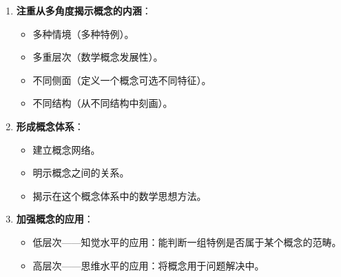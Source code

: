 \begin{multicols}{2}
    

\begin{enumerate}
    \item \textbf{注重从多角度揭示概念的内涵}：
    \begin{itemize}
        \item 多种情境（多种特例）。
        \item 多重层次（数学概念发展性）。
        \item 不同侧面（定义一个概念可选不同特征）。
        \item 不同结构（从不同结构中刻画）。
    \end{itemize}
\columnbreak
    \item \textbf{形成概念体系}：
    \begin{itemize}
        \item 建立概念网络。
        \item 明示概念之间的关系。
        \item 揭示在这个概念体系中的数学思想方法。
    \end{itemize}

    \item \textbf{加强概念的应用}：
    \begin{itemize}
        \item 低层次——知觉水平的应用：能判断一组特例是否属于某个概念的范畴。
        \item 高层次——思维水平的应用：将概念用于问题解决中。
    \end{itemize}
\end{enumerate}
\end{multicols}